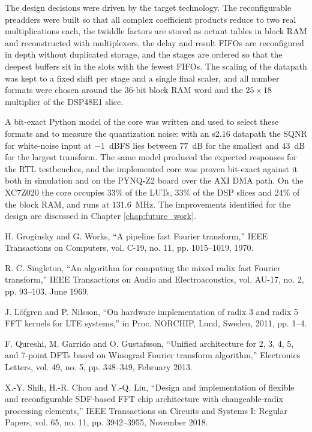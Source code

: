 \documentclass[a4paper,12pt, master]{etf}
\begin{document}
The design decisions were driven by the target technology. The reconfigurable preadders were built so that all complex coefficient products reduce to two real multiplications each, the twiddle factors are stored as octant tables in block RAM and reconstructed with multiplexers, the delay and result FIFOs are reconfigured in depth without duplicated storage, and the stages are ordered so that the deepest buffers sit in the slots with the fewest FIFOs. The scaling of the datapath was kept to a fixed shift per stage and a single final scaler, and all number formats were chosen around the 36-bit block RAM word and the $25 \times 18$ multiplier of the DSP48E1 slice.

A bit-exact Python model of the core was written and used to select these formats and to measure the quantization noise: with an s2.16 datapath the SQNR for white-noise input at $-1$~dBFS lies between $77$~dB for the smallest and $43$~dB for the largest transform. The same model produced the expected responses for the RTL testbenches, and the implemented core was proven bit-exact against it both in simulation and on the PYNQ-Z2 board over the AXI DMA path. On the XC7Z020 the core occupies 33\% of the LUTs, 33\% of the DSP slices and 24\% of the block RAM, and runs at $131.6$~MHz. The improvements identified for the design are discussed in Chapter \ref{chap:future_work}.


 H. Groginsky and G. Works, “A pipeline fast Fourier transform,” IEEE Transactions on Computers, vol. C-19, no. 11, pp. 1015–1019, 1970.

 R. C. Singleton, “An algorithm for computing the mixed radix fast Fourier transform,” IEEE Transactions on Audio and Electroacoustics, vol. AU-17, no. 2, pp. 93–103, June 1969.

 J. Löfgren and P. Nilsson, “On hardware implementation of radix 3 and radix 5 FFT kernels for LTE systems,” in Proc. NORCHIP, Lund, Sweden, 2011, pp. 1–4.

 F. Qureshi, M. Garrido and O. Gustafsson, “Unified architecture for 2, 3, 4, 5, and 7-point DFTs based on Winograd Fourier transform algorithm,” Electronics Letters, vol. 49, no. 5, pp. 348–349, February 2013.

 X.-Y. Shih, H.-R. Chou and Y.-Q. Liu, “Design and implementation of flexible and reconfigurable SDF-based FFT chip architecture with changeable-radix processing elements,” IEEE Transactions on Circuits and Systems I: Regular Papers, vol. 65, no. 11, pp. 3942–3955, November 2018.
\end{document}

